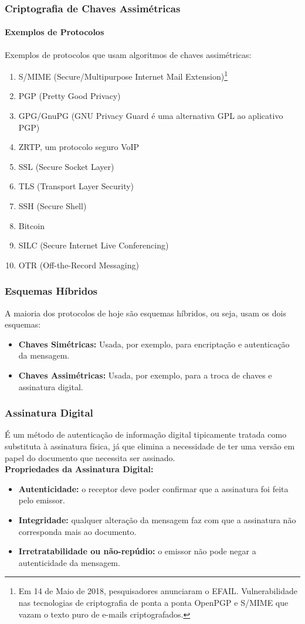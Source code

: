 \documentclass[compress]{beamer}
\begin{document}
\begin{frame}
\frametitle{Criptografia de Chaves Assimétricas}
\framesubtitle{Exemplos de Protocolos}
\justifying Exemplos de protocolos que usam algoritmos de chaves assimétricas:
	\begin{enumerate}
		\item {S/MIME (Secure/Multipurpose Internet Mail Extension)\footnote{Em 14 de Maio de 2018, pesquisadores anunciaram o EFAIL. Vulnerabilidade nas tecnologias de criptografia de ponta a ponta OpenPGP e S/MIME que vazam o texto puro de e-mails criptografados.} }
		\item {PGP (Pretty Good Privacy)}
		\item {GPG/GnuPG (GNU Privacy Guard é uma alternativa GPL ao aplicativo PGP)}
		\item {ZRTP, um protocolo seguro VoIP}
		\item {SSL (Secure Socket Layer)}
		\item {TLS (Transport Layer Security)}
		\item {SSH (Secure Shell)}
		\item {Bitcoin} 
		\item {SILC (Secure Internet Live Conferencing)}
		\item {OTR (Off-the-Record Messaging)}	 
	\end{enumerate}
\end{frame}

\begin{frame}
\frametitle{Esquemas Híbridos}
A maioria dos protocolos de hoje são esquemas híbridos, ou seja, usam os dois esquemas:
	\begin{itemize}
		\item<+->{\textbf{Chaves Simétricas:} Usada, por exemplo, para encriptação e autenticação da mensagem.}
		\item<+->{\textbf{Chaves Assimétricas:} Usada, por exemplo, para a troca de chaves e assinatura digital.}
	\end{itemize}
\end{frame}

\begin{frame}
\frametitle{Assinatura Digital}
  \justifying É um método de autenticação de informação digital tipicamente tratada como substituta à assinatura física, já que elimina a necessidade de ter uma versão em papel do documento que necessita ser assinado.\\
  \textbf<+->{Propriedades da Assinatura Digital:}
  	\begin{itemize}
		\item<+->{\textbf{Autenticidade:} o receptor deve poder confirmar que a assinatura foi feita pelo emissor.}
		\item<+->{\textbf{Integridade:} qualquer alteração da mensagem faz com que a assinatura não corresponda mais ao documento.}
		\item<+->{\textbf{Irretratabilidade ou não-repúdio:} o emissor não pode negar a autenticidade da mensagem.}
	\end{itemize}
\end{frame}
\end{document}

